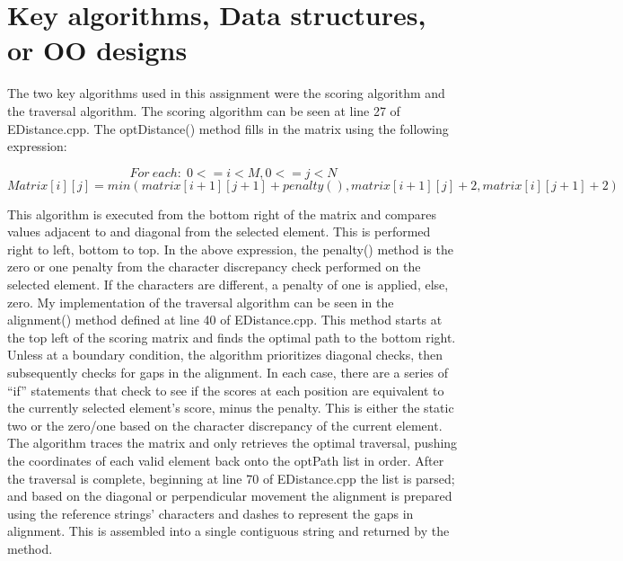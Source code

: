 \documentclass[12pt]{article}
\begin{document}
\section[2]{Key algorithms, Data structures, or OO designs}
\hfill\begin{minipage}{\dimexpr\textwidth-1cm}
The two key algorithms used in this assignment were the scoring algorithm and the traversal algorithm. The scoring algorithm can be seen at line 27 of EDistance.cpp. The optDistance() method fills in the matrix using the following expression:

\[For\:each:\;0 <= i < M, 0 <= j < N\]
\[Matrix[i][j] = min ( matrix[i+1][j+1] + penalty(), matrix[i+1][j] + 2, matrix[i][j+1] + 2 )\]

This algorithm is executed from the bottom right of the matrix and compares values adjacent to and diagonal from the selected element. This is performed right to left, bottom to top. In the above expression, the penalty() method is the zero or one penalty from the character discrepancy check performed on the selected element. If the characters are different, a penalty of one is applied, else, zero. \newline
\newline
My implementation of the traversal algorithm can be seen in the alignment() method defined at line 40 of EDistance.cpp. This method starts at the top left of the scoring matrix and finds the optimal path to the bottom right. Unless at a boundary condition, the algorithm prioritizes diagonal checks, then subsequently checks for gaps in the alignment. In each case, there are a series of “if” statements that check to see if the scores at each position are equivalent to the currently selected element’s score, minus the penalty. This is either the static two or the zero/one based on the character discrepancy of the current element. The algorithm traces the matrix and only retrieves the optimal traversal, pushing the coordinates of each valid element back onto the optPath list in order. After the traversal is complete, beginning at line 70 of EDistance.cpp the list is parsed; and based on the diagonal or perpendicular movement the alignment is prepared using the reference strings’ characters and dashes to represent the gaps in alignment. This is assembled into a single contiguous string and returned by the method.
\end{minipage}
\end{document}
